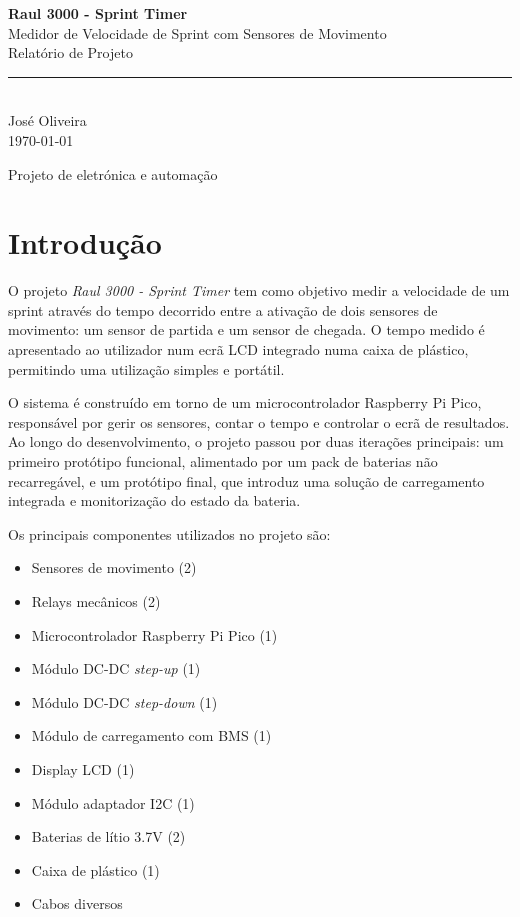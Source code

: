 \documentclass[11pt,a4paper]{article}
\title{}
\author{}
\date{}
\begin{document}
\begin{titlepage}
\centering
\vspace*{3cm}

{\Huge\bfseries\color{corprincipal} Raul 3000 - Sprint Timer}\\[0.5cm]
{\Large Medidor de Velocidade de Sprint com Sensores de Movimento}\\[2cm]

{\large Relatório de Projeto}\\[3cm]

\rule{0.6\textwidth}{0.4pt}\\[0.5cm]
{\large José Oliveira}\\[0.3cm]
{\normalsize \today}

\vfill

{\small Projeto de eletrónica e automação}

\end{titlepage}

\section*{Introdução}

O projeto \emph{Raul 3000 - Sprint Timer} tem como objetivo medir a velocidade de um sprint através do tempo decorrido entre a ativação de dois sensores de movimento: um sensor de partida e um sensor de chegada. O tempo medido é apresentado ao utilizador num ecrã LCD integrado numa caixa de plástico, permitindo uma utilização simples e portátil.

O sistema é construído em torno de um microcontrolador Raspberry Pi Pico, responsável por gerir os sensores, contar o tempo e controlar o ecrã de resultados. Ao longo do desenvolvimento, o projeto passou por duas iterações principais: um primeiro protótipo funcional, alimentado por um pack de baterias não recarregável, e um protótipo final, que introduz uma solução de carregamento integrada e monitorização do estado da bateria.

Os principais componentes utilizados no projeto são:

\begin{itemize}[itemsep=1pt]
    \item Sensores de movimento (2)
    \item Relays mecânicos (2)
    \item Microcontrolador Raspberry Pi Pico (1)
    \item Módulo DC-DC \textit{step-up} (1)
    \item Módulo DC-DC \textit{step-down} (1)
    \item Módulo de carregamento com BMS (1)
    \item Display LCD (1)
    \item Módulo adaptador I2C (1)
    \item Baterias de lítio 3.7V (2)
    \item Caixa de plástico (1)
    \item Cabos diversos
\end{itemize}
\end{document}
